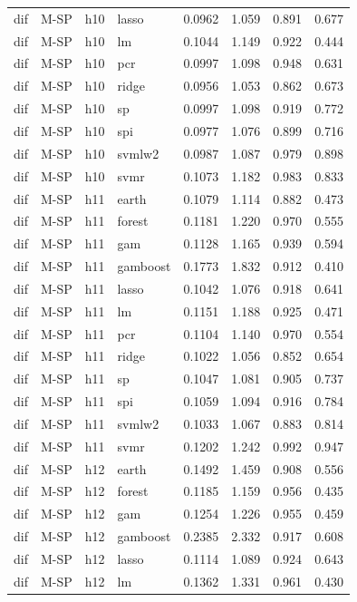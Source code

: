 \begin{ThreePartTable}
\begin{longtable}[t]{llclcccc}
dif & M-SP & h10 & lasso & 0.0962 & 1.059 & 0.891 & 0.677\\
dif & M-SP & h10 & lm & 0.1044 & 1.149 & 0.922 & 0.444\\
dif & M-SP & h10 & pcr & 0.0997 & 1.098 & 0.948 & 0.631\\
dif & M-SP & h10 & ridge & 0.0956 & 1.053 & 0.862 & 0.673\\
dif & M-SP & h10 & sp & 0.0997 & 1.098 & 0.919 & 0.772\\
dif & M-SP & h10 & spi & 0.0977 & 1.076 & 0.899 & 0.716\\
dif & M-SP & h10 & svmlw2 & 0.0987 & 1.087 & 0.979 & 0.898\\
dif & M-SP & h10 & svmr & 0.1073 & 1.182 & 0.983 & 0.833\\
\addlinespace
dif & M-SP & h11 & earth & 0.1079 & 1.114 & 0.882 & 0.473\\
dif & M-SP & h11 & forest & 0.1181 & 1.220 & 0.970 & 0.555\\
dif & M-SP & h11 & gam & 0.1128 & 1.165 & 0.939 & 0.594\\
dif & M-SP & h11 & gamboost & 0.1773 & 1.832 & 0.912 & 0.410\\
dif & M-SP & h11 & lasso & 0.1042 & 1.076 & 0.918 & 0.641\\
dif & M-SP & h11 & lm & 0.1151 & 1.188 & 0.925 & 0.471\\
dif & M-SP & h11 & pcr & 0.1104 & 1.140 & 0.970 & 0.554\\
dif & M-SP & h11 & ridge & 0.1022 & 1.056 & 0.852 & 0.654\\
dif & M-SP & h11 & sp & 0.1047 & 1.081 & 0.905 & 0.737\\
dif & M-SP & h11 & spi & 0.1059 & 1.094 & 0.916 & 0.784\\
dif & M-SP & h11 & svmlw2 & 0.1033 & 1.067 & 0.883 & 0.814\\
dif & M-SP & h11 & svmr & 0.1202 & 1.242 & 0.992 & 0.947\\
\addlinespace
dif & M-SP & h12 & earth & 0.1492 & 1.459 & 0.908 & 0.556\\
dif & M-SP & h12 & forest & 0.1185 & 1.159 & 0.956 & 0.435\\
dif & M-SP & h12 & gam & 0.1254 & 1.226 & 0.955 & 0.459\\
dif & M-SP & h12 & gamboost & 0.2385 & 2.332 & 0.917 & 0.608\\
dif & M-SP & h12 & lasso & 0.1114 & 1.089 & 0.924 & 0.643\\
dif & M-SP & h12 & lm & 0.1362 & 1.331 & 0.961 & 0.430\\

\end{longtable}
\end{ThreePartTable}
